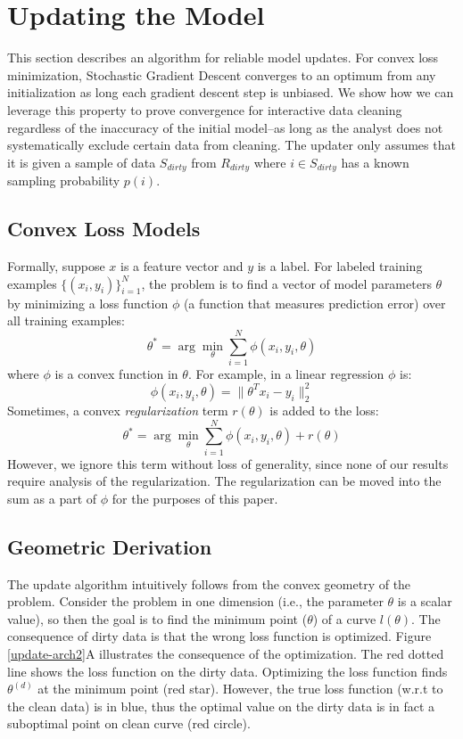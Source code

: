 \section{Updating the Model}\label{model-update}
This section describes an algorithm for reliable model updates.
For convex loss minimization, Stochastic Gradient Descent converges to an optimum from any initialization as long each gradient descent step is unbiased.
We show how we can leverage this property to prove convergence for interactive data cleaning regardless of the inaccuracy of the initial model--as long as the analyst does not systematically exclude certain data from cleaning. 
The updater only assumes that it is given a sample of data $S_{dirty}$ from $R_{dirty}$ where $i \in S_{dirty}$ has a known sampling probability $p(i)$.

\subsection{Convex Loss Models}
Formally, suppose $x$ is a feature vector and $y$ is a label.
For labeled training examples $\{(x_{i},y_{i})\}_{i=1}^{N}$, the problem is to find a vector of model parameters $\theta$ by minimizing a loss function $\phi$ (a function that measures prediction error) over all training examples:
\[
 \theta^{*}=\arg\min_{\theta}\sum_{i=1}^{N}\phi(x_{i},y_{i},\theta)
\]
where $\phi$ is a convex function in $\theta$.
For example, in a linear regression $\phi$ is:
\[
\phi(x_{i},y_{i},\theta) = \|\theta^Tx_{i} - y_i \|_2^2
\]
Sometimes, a convex \emph{regularization} term $r(\theta)$ is added to the loss:
\[
 \theta^{*}=\arg\min_{\theta}\sum_{i=1}^{N}\phi(x_{i},y_{i},\theta) + r(\theta)
\]
However, we ignore this term without loss of generality, since none of our results require analysis of the regularization.
The regularization can be moved into the sum as a part of $\phi$ for the purposes of this paper.

\subsection{Geometric Derivation}\label{geod}
The update algorithm intuitively follows from the convex geometry of the problem.
Consider the problem in one dimension (i.e., the parameter $\theta$ is a scalar value), so then the goal is to find the minimum point ($\theta$) of a curve $l(\theta)$.
The consequence of dirty data is that the wrong loss function is optimized.
Figure \ref{update-arch2}A illustrates the consequence of the optimization.
The red dotted line shows the loss function on the dirty data.
Optimizing the loss function finds $\theta^{(d)}$ at the minimum point (red star).
However, the true loss function (w.r.t to the clean data) is in blue, thus
the optimal value on the dirty data is in fact a suboptimal point on clean curve (red circle).

